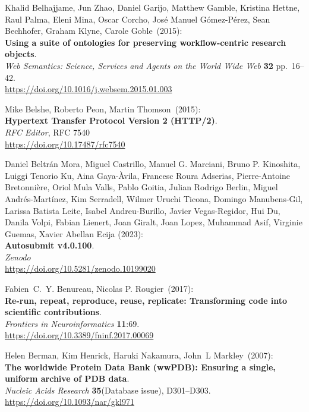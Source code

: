 \begin{thebibliography}{9}
Khalid Belhajjame, Jun Zhao, Daniel Garijo, Matthew Gamble,
Kristina Hettne, Raul Palma, Eleni Mina, Oscar Corcho, José Manuel
Gómez-Pérez, Sean Bechhofer, Graham Klyne, Carole Goble~(2015): \\
\textbf{Using a suite of ontologies for preserving workflow-centric
research objects}.\\
\emph{Web Semantics: Science, Services and Agents on the World Wide Web}
\textbf{32} pp.~16--42.\\
\url{https://doi.org/10.1016/j.websem.2015.01.003}

Mike Belshe, Roberto Peon, Martin Thomson~(2015): \\
\textbf{Hypertext Transfer Protocol Version 2 (HTTP/2)}.\\
\emph{RFC Editor}, RFC 7540\\
\url{https://doi.org/10.17487/rfc7540}

Daniel Beltrán Mora, Miguel Castrillo, Manuel G. Marciani, Bruno P. Kinoshita, Luiggi Tenorio Ku, Aina Gaya-Àvila, Francesc Roura Adserias,  Pierre-Antoine Bretonnière, Oriol Mula Valls, Pablo Goitia, Julian Rodrigo Berlin,  Miguel Andrés-Martínez, Kim Serradell, Wilmer Uruchi Ticona,  Domingo Manubens-Gil, Larissa Batista Leite, Isabel Andreu-Burillo, Javier Vegas-Regidor, Hui Du, Danila Volpi, Fabian Lienert, Joan Giralt, Joan Lopez, Muhammad Asif, Virginie Guemas, Xavier Abellan Ecija (2023):\\
\textbf{Autosubmit v4.0.100}.\\
\emph{Zenodo} \\
\url{https://doi.org/10.5281/zenodo.10199020}

Fabien~C.~Y. Benureau, Nicolas P. Rougier~(2017): \\
\textbf{Re-run, repeat, reproduce, reuse, replicate: Transforming code
into scientific contributions}.\\
\emph{Frontiers in Neuroinformatics} \textbf{11}:69.\\
\url{https://doi.org/10.3389/fninf.2017.00069}

Helen Berman, Kim Henrick, Haruki Nakamura, John~L Markley~(2007): \\
\textbf{The worldwide Protein Data Bank (wwPDB): Ensuring a single,
uniform archive of PDB data}.\\
\emph{Nucleic Acids Research} \textbf{35}(Database issue),
D301--D303.\\
\url{https://doi.org/10.1093/nar/gkl971}


\end{thebibliography}
